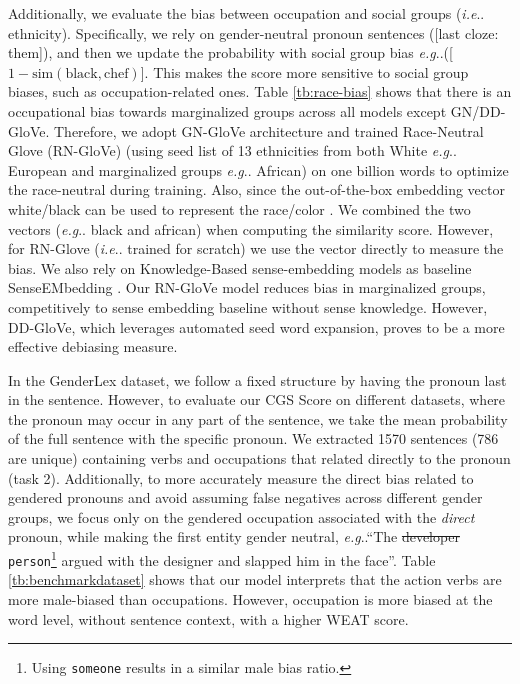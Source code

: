 \documentclass[11pt]{article}
\makeatletter
\newcommand{\R}[1]{{\color{black} {#1}}}
\newcommand{\q}[1]{``#1''}
\def\eg{\emph{e.g}\onedot} \def\Eg{\emph{E.g}\onedot}
\def\ie{\emph{i.e}\onedot} \def\Ie{\emph{I.e}\onedot}
\DeclareRobustCommand\ie{%
  \UKUS@comma{i.e}%
}
\DeclareRobustCommand\eg{%
  \UKUS@comma{e.g}%
}
\DeclareRobustCommand\onedot{\futurelet\@let@token\@onedot}
\def\@onedot{\ifx\@let@token.\else.\null\fi\xspace}
\DeclareRobustCommand\onedot{\futurelet\@let@token\@onedot}
\def\@onedot{\ifx\@let@token.\else.\null\fi\xspace}
\DeclareRobustCommand\onedot{\futurelet\@let@token\@onedot}
\def\@onedot{\ifx\@let@token.\else.\null\fi\xspace}
\def\eg{\emph{e.g}\onedot} \def\Eg{\emph{E.g}\onedot}
\def\ie{\emph{i.e}\onedot} \def\Ie{\emph{I.e}\onedot}
\makeatother
\begin{document}
{{\R{Additionally, we evaluate the bias between occupation and social groups  (\ie ethnicity). Specifically, we rely on gender-neutral pronoun sentences ([last cloze: them]), and then we update the probability with social group bias \eg ([$1-\text{sim}(\text{black}, \text{chef})$]. This makes the score more sensitive to social group biases, such as occupation-related ones. } Table \ref{tb:race-bias} shows that there is an occupational bias towards marginalized groups across all models except GN/DD-GloVe. Therefore, we adopt GN-GloVe architecture and trained Race-Neutral Glove (RN-GloVe) (using seed list of 13 ethnicities from both White \eg European and marginalized groups \eg African) on one billion words to optimize the race-neutral during training.  Also, since the out-of-the-box embedding vector white/black can be used to represent the race/color \cite{zhou2022sense}. We combined the two vectors (\eg black and african)  when computing the similarity score. However, for RN-Glove (\ie trained for scratch) we use the vector directly to measure the bias.  We also rely on Knowledge-Based sense-embedding models as baseline SenseEMbedding \cite{iacobacci2015sensembed}. Our RN-GloVe model reduces bias in marginalized groups, competitively to sense embedding baseline without sense knowledge. However, DD-GloVe, which leverages automated seed word expansion, proves to be a more effective debiasing measure.


 \R{In the GenderLex dataset, we follow a fixed structure by having the pronoun last in the sentence. However, to evaluate our CGS Score on different datasets, where the pronoun may occur in any part of the sentence, we take the mean probability of the full sentence with the specific pronoun.} We extracted 1570 sentences (786 are unique) containing verbs and occupations that related directly to the pronoun (task 2). Additionally, to more accurately measure the direct bias related to gendered pronouns and avoid assuming false negatives across different gender groups, we focus only on the gendered occupation associated with the \textit{direct} pronoun, while making the first entity gender neutral, \eg \q{The \st{developer} \texttt{person}\footnote{Using \texttt{someone} results in a similar male bias ratio.} argued with the designer and slapped him in the face}. Table \ref{tb:benchmarkdataset} shows that our model interprets that the action verbs are more male-biased than occupations. However, occupation is more biased at the word level, without sentence context, with a higher WEAT score. 

}}
\end{document}
